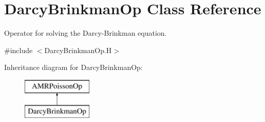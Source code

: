 \hypertarget{class_darcy_brinkman_op}{\section{Darcy\-Brinkman\-Op Class Reference}
\label{class_darcy_brinkman_op}
}


Operator for solving the Darcy-\/\-Brinkman equation.  




{\ttfamily \#include $<$Darcy\-Brinkman\-Op.\-H$>$}

Inheritance diagram for Darcy\-Brinkman\-Op\-:\begin{figure}[H]
\begin{center}
\leavevmode
\includegraphics[height=2.000000cm]{class_darcy_brinkman_op}
\end{center}
\end{figure}
